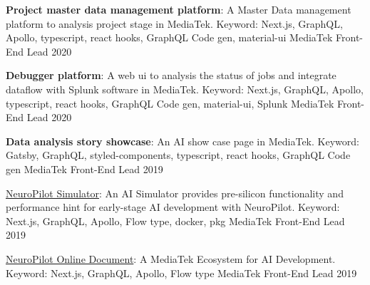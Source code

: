 
\begin{cvhonors}

  \cvhonor
    {\textbf{Project master data management platform}: \textmd{A Master Data management platform to analysis project stage in MediaTek. Keyword: Next.js, GraphQL, Apollo, typescript, react hooks, GraphQL Code gen, material-ui}} %
    {MediaTek} %
    {Front-End Lead} %
    {2020} %

  \cvhonor
    {\textbf{Debugger platform}: \textmd{A web ui to analysis the status of jobs and integrate dataflow with Splunk software in MediaTek. Keyword: Next.js, GraphQL, Apollo, typescript, react hooks, GraphQL Code gen, material-ui, Splunk}} %
    {MediaTek} %
    {Front-End Lead} %
    {2020} %

  \cvhonor
    {\textbf{Data analysis story showcase}: \textmd{An AI show case page in MediaTek. Keyword: Gatsby, GraphQL, styled-components, typescript, react hooks, GraphQL Code gen}} %
    {MediaTek} %
    {Front-End Lead} %
    {2019} %

  \cvhonor
    {\href{https://neuropilot.mediatek.com/}{NeuroPilot Simulator}: \textmd{An AI Simulator provides pre-silicon functionality and performance hint for early-stage AI development with NeuroPilot. Keyword: Next.js, GraphQL, Apollo, Flow type, docker, pkg}} %
    {MediaTek} %
    {Front-End Lead} %
    {2019} %

  \cvhonor
    {\href{https://neuropilot.mediatek.com/}{NeuroPilot Online Document}: \textmd{A MediaTek Ecosystem for AI Development. Keyword: Next.js, GraphQL, Apollo, Flow type}} %
    {MediaTek} %
    {Front-End Lead} %
    {2019} %


\end{cvhonors}
